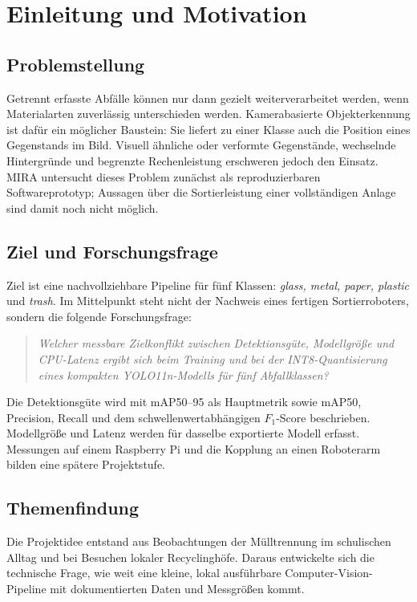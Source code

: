 \section{Einleitung und Motivation}

\subsection{Problemstellung}
Getrennt erfasste Abfälle können nur dann gezielt weiterverarbeitet werden, wenn Materialarten zuverlässig unterschieden werden. Kamerabasierte Objekterkennung ist dafür ein möglicher Baustein: Sie liefert zu einer Klasse auch die Position eines Gegenstands im Bild. Visuell ähnliche oder verformte Gegenstände, wechselnde Hintergründe und begrenzte Rechenleistung erschweren jedoch den Einsatz. MIRA untersucht dieses Problem zunächst als reproduzierbaren Softwareprototyp; Aussagen über die Sortierleistung einer vollständigen Anlage sind damit noch nicht möglich.

\subsection{Ziel und Forschungsfrage}
Ziel ist eine nachvollziehbare Pipeline für fünf Klassen: \textit{glass, metal, paper, plastic} und \textit{trash}. Im Mittelpunkt steht nicht der Nachweis eines fertigen Sortierroboters, sondern die folgende Forschungsfrage:

\begin{quote}
\emph{Welcher messbare Zielkonflikt zwischen Detektionsgüte, Modellgröße und CPU-Latenz ergibt sich beim Training und bei der INT8-Quantisierung eines kompakten YOLO11n-Modells für fünf Abfallklassen?}
\end{quote}

Die Detektionsgüte wird mit mAP50--95 als Hauptmetrik sowie mAP50, Precision, Recall und dem schwellenwertabhängigen $F_1$-Score beschrieben. Modellgröße und Latenz werden für dasselbe exportierte Modell erfasst. Messungen auf einem Raspberry Pi und die Kopplung an einen Roboterarm bilden eine spätere Projektstufe.

\subsection{Themenfindung}
Die Projektidee entstand aus Beobachtungen der Mülltrennung im schulischen Alltag und bei Besuchen lokaler Recyclinghöfe. Daraus entwickelte sich die technische Frage, wie weit eine kleine, lokal ausführbare Computer-Vision-Pipeline mit dokumentierten Daten und Messgrößen kommt.

